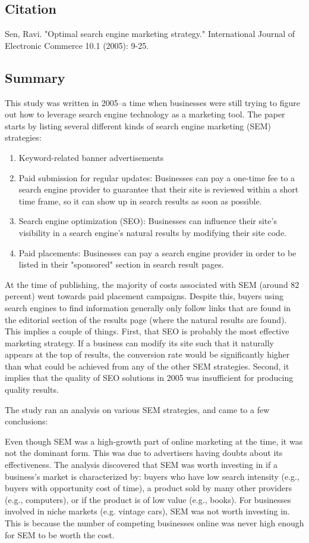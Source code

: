 \documentclass[../summaries.tex]{subfiles}
\begin{document}
\subsection{Citation}
Sen, Ravi. "Optimal search engine marketing strategy." International Journal of Electronic Commerce 10.1 (2005): 9-25.

\subsection{Summary}
This study was written in 2005--a time when businesses were still trying to figure out how to leverage search engine technology as a marketing tool. The paper starts by listing several different kinds of search engine marketing (SEM) strategies:

\begin{enumerate}
\item Keyword-related banner advertisements
\item Paid submission for regular updates: Businesses can pay a one-time fee to a search engine provider to guarantee that their site is reviewed within a short time frame, so it can show up in search results as soon as possible.
\item Search engine optimization (SEO): Businesses can influence their site's visibility in a search engine's natural results by modifying their site code.
\item Paid placements: Businesses can pay a search engine provider in order to be listed in their "sponsored" section in search result pages.
\end{enumerate}

At the time of publishing, the majority of costs associated with SEM (around 82 percent) went towards paid placement campaigns. Despite this, buyers using search engines to find information generally only follow links that are found in the editorial section of the results page (where the natural results are found). This implies a couple of things. First, that SEO is probably the most effective marketing strategy. If a business can modify its site such that it naturally appears at the top of results, the conversion rate would be significantly higher than what could be achieved from any of the other SEM strategies. Second, it implies that the quality of SEO solutions in 2005 was insufficient for producing quality results.

The study ran an analysis on various SEM strategies, and came to a few conclusions:

Even though SEM was a high-growth part of online marketing at the time, it was not the dominant form. This was due to advertisers having doubts about its effectiveness. The analysis discovered that SEM was worth investing in if a business's market is characterized by: buyers who have low search intensity (e.g., buyers with opportunity cost of time), a product sold by many other providers (e.g., computers), or if the product is of low value (e.g., books). For businesses involved in niche markets (e.g. vintage cars), SEM was not worth investing in. This is because the number of competing businesses online was never high enough for SEM to be worth the cost.
\end{document}
